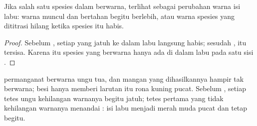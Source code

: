 \begin{proposition}\label{prop:g11:titration:colour}
Jika salah satu spesies dalam  berwarna,  terlihat
sebagai perubahan warna isi labu: warna  muncul dan bertahan
begitu  berlebih, atau warna spesies yang dititrasi hilang ketika
spesies itu habis.
\end{proposition}

\begin{proof}
Sebelum , setiap   yang jatuh ke dalam labu
langsung habis; sesudah ,  itu tersisa. Karena itu
spesies yang berwarna hanya ada di dalam labu pada satu sisi .
\end{proof}

\begin{example}\label{ex:g11:titration:permanganate}
 permanganat  berwarna ungu tua, dan  mangan
 yang dihasilkannya hampir tak berwarna;  besi hanya
memberi larutan itu rona kuning pucat. Sebelum , setiap
tetes ungu kehilangan warnanya begitu jatuh; tetes pertama yang tidak
kehilangan warnanya menandai : isi labu menjadi merah
muda pucat dan tetap begitu.
\end{example}


